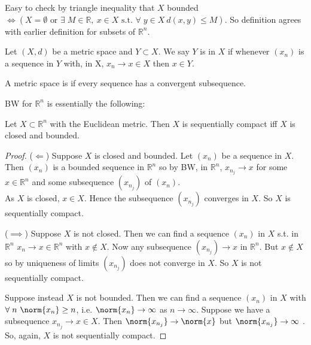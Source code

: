 \begin{remark}
    Easy to check by triangle inequality that $X$ bounded $\iff (X = \emptyset \text{ or } \exists \; M \in \mathbb{R},\ x \in X \text{ s.t. } \forall \; y \in X \ d(x, y) \leq M)$.
    So definition agrees with earlier definition for subsets of $\mathbb{R}^n$.
\end{remark} 

\begin{definition}
    Let $(X, d)$ be a metric space and $Y \subset X$.
    We say $Y$ is  in $X$ if whenever $(x_n)$ is a sequence in $Y$ with, in X, $x_n \to x \in X$ then $x \in Y$.
\end{definition} 

\begin{definition}
    A metric space is  if every sequence has a convergent subsequence.
\end{definition}  

BW for $\mathbb{R}^n$ is essentially the following:
\begin{theorem} \label{thm:20}
    Let $X \subset \mathbb{R}^n$ with the Euclidean metric.
    Then $X$ is sequentially compact iff $X$ is closed and bounded.
\end{theorem} 

\begin{proof}
    ($\Longleftarrow$) Suppose $X$ is closed and bounded.
    Let $(x_n)$ be a sequence in $X$.
    Then $(x_n)$ is a bounded sequence in $\mathbb{R}^n$ so by BW, in $\mathbb{R}^n$, $x_{n_j} \to x$ for some $ x \in \mathbb{R}^n$ and some subsequence $(x_{n_j})$ of $(x_n)$. \\
    As $X$ is closed, $x \in X$.
    Hence the subsequence $(x_{n_j})$ converges in $X$.
    So $X$ is sequentially compact.

    ($\implies$) Suppose $X$ is not closed.
    Then we can find a sequence $(x_n)$ in $X$ s.t. in $\mathbb{R}^n$ $x_n \to x \in \mathbb{R}^n$ with $x \notin X$.
    Now any subsequence $(x_{n_j}) \to x$ in $\mathbb{R}^n$.
    But $x \notin X$ so by uniqueness of limits $(x_{n_j})$ does not converge in $X$.
    So $X$ is not sequentially compact.

    Suppose instead $X$ is not bounded.
    Then we can find a sequence $(x_n)$ in $X$ with $\forall \; n \ \norm{x_n} \geq n$, i.e. $\norm{x_n} \to \infty$ as $n \to \infty$.
    Suppose we have a subsequence $x_{n_j} \to x \in X$.
    Then $\norm{x_{n_j}} \to \norm{x}$ but $\norm{x_{n_j}} \to \infty$ \Lightning.
    So, again, $X$ is not sequentially compact.
\end{proof} 

